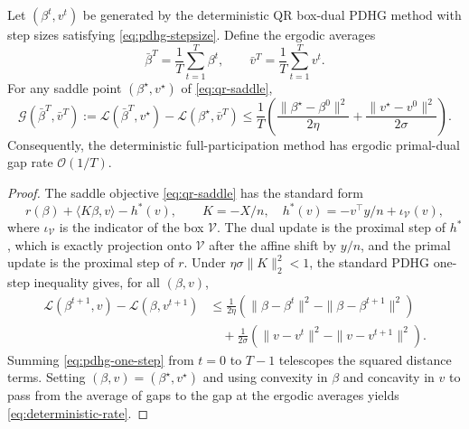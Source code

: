 \begin{theorem}
\label{thm:deterministic-pdhg}
Let $(\beta^t,v^t)$ be generated by the deterministic QR box-dual PDHG method
with step sizes satisfying \eqref{eq:pdhg-stepsize}. Define the ergodic
averages
\begin{equation}
    \bar{\beta}^T=\frac{1}{T}\sum_{t=1}^T \beta^t,
    \qquad
    \bar{v}^T=\frac{1}{T}\sum_{t=1}^T v^t .
\end{equation}
For any saddle point $(\beta^\star,v^\star)$ of \eqref{eq:qr-saddle},
\begin{equation}
    \mathcal{G}(\bar{\beta}^T,\bar{v}^T)
    :=
    \mathcal{L}(\bar{\beta}^T,v^\star)
    -
    \mathcal{L}(\beta^\star,\bar{v}^T)
    \le
    \frac{1}{T}
    \left(
        \frac{\|\beta^\star-\beta^0\|^2}{2\eta}
        +
        \frac{\|v^\star-v^0\|^2}{2\sigma}
    \right).
    \label{eq:deterministic-rate}
\end{equation}
Consequently, the deterministic full-participation method has ergodic
primal-dual gap rate $\mathcal{O}(1/T)$.
\end{theorem}

\begin{proof}
The saddle objective \eqref{eq:qr-saddle} has the standard form
\[
    r(\beta) + \langle K\beta,v\rangle - h^\ast(v),
    \qquad
    K=-X/n,\quad
    h^\ast(v)= -v^\top y/n + \iota_{\mathcal{V}}(v),
\]
where $\iota_{\mathcal{V}}$ is the indicator of the box $\mathcal{V}$. The
dual update is the proximal step of $h^\ast$, which is exactly projection onto
$\mathcal{V}$ after the affine shift by $y/n$, and the primal update is the
proximal step of $r$. Under
$\eta\sigma\|K\|_2^2<1$, the standard PDHG one-step inequality gives, for all
$(\beta,v)$,
\begin{align}
    \mathcal{L}(\beta^{t+1},v)-\mathcal{L}(\beta,v^{t+1})
    &\le
    \frac{1}{2\eta}
    \left(
        \|\beta-\beta^t\|^2-\|\beta-\beta^{t+1}\|^2
    \right) \nonumber\\
    &\quad+
    \frac{1}{2\sigma}
    \left(
        \|v-v^t\|^2-\|v-v^{t+1}\|^2
    \right).
    \label{eq:pdhg-one-step}
\end{align}
Summing \eqref{eq:pdhg-one-step} from $t=0$ to $T-1$ telescopes the squared
distance terms. Setting $(\beta,v)=(\beta^\star,v^\star)$ and using convexity
in $\beta$ and concavity in $v$ to pass from the average of gaps to the gap at
the ergodic averages yields \eqref{eq:deterministic-rate}.
\end{proof}

